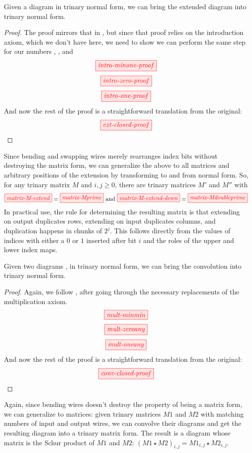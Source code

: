 \begin{lemma}\label{lem:extclosed}
    Given a diagram  in trinary normal form, we can bring
    the extended diagram  into trinary normal form.
\end{lemma}
\begin{proof}
    The proof mirrors that in \cite{backens2018zhcalculus}, but since that proof
    relies on the introduction axiom, which we don't have here, we need to show
    we can perform the same step for our numbers , , and
    $$\tikzfig{intro-minone-proof}$$
    $$\tikzfig{intro-zero-proof}$$
    $$\tikzfig{intro-one-proof}$$
    And now the rest of the proof is a straightforward translation from the
    original:
    $$\tikzfig{ext-closed-proof}$$
\end{proof}
\begin{corollary}
    Since bending and swapping wires merely rearranges index bits without
    destroying the matrix form, we can generalize the above to all matrices and
    arbitrary positions of the extension by transforming to and from normal
    form. So, for any trinary matrix $M$ and $i, j \geq 0$, there are trinary
    matrices $M'$ and $M''$ with
    $$\tikzfig{matrix-M-extend} = \tikzfig{matrix-Mprime} \text{ and }%
    \tikzfig{matrix-M-extend-down} = \tikzfig{matrix-Mdoubleprime}$$
    In practical use, the rule for determining the resulting matrix is that
    extending on output duplicates rows, extending on input duplicates columns,
    and duplication happens in chunks of $2^j$. This follows directly from the
    values of indices with either a $0$ or $1$ inserted after bit $i$ and the
    roles of the upper and lower index maps.
\end{corollary}

\begin{lemma}\label{lem:convclosed}
    Given two diagrams ,
     in
    trinary normal form, we can bring the convolution
     into trinary normal form.
\end{lemma}
\begin{proof}
    Again, we follow \cite{backens2018zhcalculus}, after going through the
    necessary replacements of the multiplication axiom.
    $$\tikzfig{mult-minmin}$$
    $$\tikzfig{mult-zeroany}$$
    $$\tikzfig{mult-oneany}$$
    And now the rest of the proof is a straightforward translation from the
    original:
    $$\tikzfig{conv-closed-proof}$$
\end{proof}
\begin{corollary}
    Again, since bending wires doesn't destroy the property of being a matrix
    form, we can generalize to matrices: given trinary matrices
    $M\scriptstyle1$ and $M\scriptstyle2$
    with matching numbers of input and output wires, we can convolve their
    diagrams and get the resulting diagram into a trinary matrix form. The
    result is a diagram whose matrix is the Schur product of $M\scriptstyle1$
    and $M\scriptstyle2$: $(M{\scriptstyle1} \star  M{\scriptstyle2})_{i,j} =%
    M{\scriptstyle1}_{i,j} \star M{\scriptstyle2}_{i,j}$.
\end{corollary}

